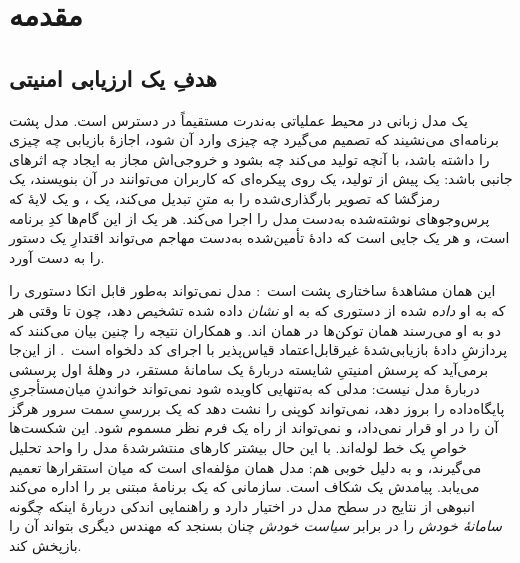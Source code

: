 \section{مقدمه}
\label{sec:introduction}

\subsection{هدفِ یک ارزیابی امنیتی }
\label{sec:intro:target}

یک مدل زبانی در محیط عملیاتی به‌ندرت مستقیماً در دسترس است. مدل پشت
برنامه‌ای می‌نشیند که تصمیم می‌گیرد چه چیزی وارد  آن شود،
اجازهٔ بازیابی چه چیزی را داشته باشد، با آنچه تولید می‌کند چه بشود و
خروجی‌اش مجاز به ایجاد چه اثرهای جانبی باشد: یک  پیش از
تولید، یک  روی پیکره‌ای که کاربران می‌توانند در آن بنویسند،
یک رمزگشا که تصویر بارگذاری‌شده را به متنِ  تبدیل می‌کند، یک
، و یک لایهٔ  که پرس‌وجوهای نوشته‌شده به‌دست
مدل را اجرا می‌کند. هر یک از این گام‌ها کدِ برنامه است، و هر یک جایی است
که دادهٔ تأمین‌شده به‌دست مهاجم می‌تواند اقتدارِ یک دستور را به دست آورد.

این همان مشاهدهٔ ساختاری پشت 
است~\cite{greshake2023}: مدل نمی‌تواند به‌طور قابل اتکا دستوری را که به
او \emph{داده} شده از دستوری که به او \emph{نشان} داده شده تشخیص دهد،
چون تا وقتی هر دو به او می‌رسند همان توکن‌ها در همان ‌اند.
 و همکاران نتیجه را چنین بیان می‌کنند که پردازشِ دادهٔ
بازیابی‌شدهٔ غیرقابل‌اعتماد قیاس‌پذیر با اجرای کد دلخواه
است~\cite[Sec.~2]{greshake2023}. از این‌جا برمی‌آید که پرسش امنیتیِ
شایسته دربارهٔ یک سامانهٔ مستقر، در وهلهٔ اول پرسشی دربارهٔ مدل نیست: مدلی
که به‌تنهایی کاویده شود نمی‌تواند خواندنِ میان‌مستأجریِ پایگاه‌داده را بروز
دهد، نمی‌تواند کوپنی را نشت دهد که یک بررسیِ  سمت سرور
هرگز آن را در  او قرار نمی‌داد، و نمی‌تواند از راه یک فرم نظر
مسموم شود. این شکست‌ها خواصِ یک خط لوله‌اند. با این حال بیشتر کارهای
منتشرشدهٔ  مدل را واحد تحلیل می‌گیرند، و به دلیل خوبی هم:
مدل همان مؤلفه‌ای است که میان استقرارها تعمیم می‌یابد. پیامدش یک شکاف
است. سازمانی که یک برنامهٔ مبتنی بر  را اداره می‌کند انبوهی از
نتایج در سطح مدل در اختیار دارد و راهنمایی اندکی دربارهٔ اینکه چگونه
\emph{سامانهٔ خودش} را در برابر \emph{سیاست خودش} چنان بسنجد که مهندس
دیگری بتواند آن را بازپخش کند.

